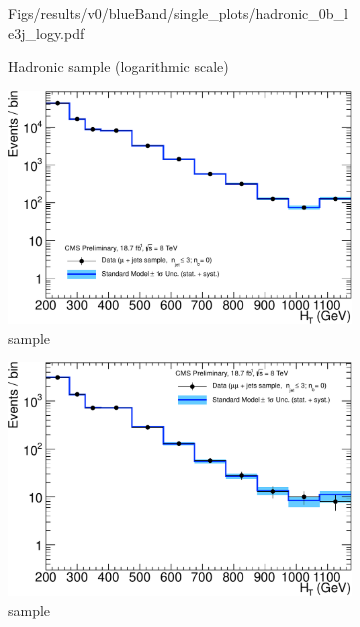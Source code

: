 \begin{figure}[h!]
\begin{subfigure}[b]{0.48\textwidth}
    {Figs/results/v0/blueBand/single_plots/hadronic_0b_le3j_logy.pdf}
    \caption{Hadronic sample (logarithmic scale)}
  \end{subfigure}
  \begin{subfigure}[b]{0.48\textwidth}
    \includegraphics[width=\textwidth]
    {Figs/results/v0/blueBand/single_plots/muon_0b_le3j_logy.pdf}
    \caption{\mj sample}
  \end{subfigure}
  \begin{subfigure}[b]{0.48\textwidth}
    \includegraphics[width=\textwidth]
    {Figs/results/v0/blueBand/single_plots/mumu_0b_le3j_logy.pdf}
    \caption{\mmj sample}
  \end{subfigure}\\
  \begin{subfigure}[b]{0.48\textwidth}

\end{subfigure}
\end{figure}
